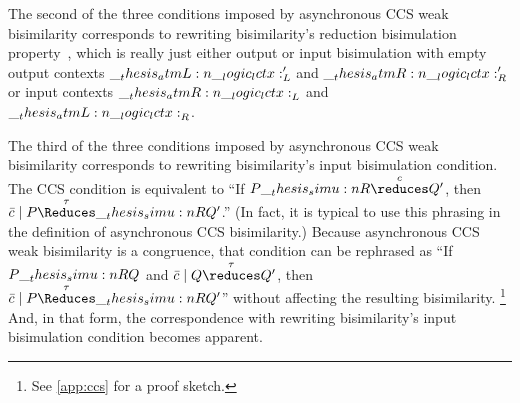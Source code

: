The second of the three conditions imposed by asynchronous \ac{CCS} weak bisimilarity corresponds to rewriting bisimilarity's reduction bisimulation property~, which is really just either output or input bisimulation with empty output contexts $\__thesis_atmL:n {\__logic_lctx:}'_L$ and $\__thesis_atmR:n {\__logic_lctx:}'_R$ or input contexts $\__thesis_atmR:n {\__logic_lctx:}_L$ and $\__thesis_atmL:n {\__logic_lctx:}_R$.

The third of the three conditions imposed by asynchronous \ac{CCS} weak bisimilarity corresponds to rewriting bisimilarity's input bisimulation condition.
The \ac{CCS} condition is equivalent to \enquote{If $P \simu{R}\overset{c}{\reduces} Q'$, then $\bar{c} \mid P \overset{\tau}{\Reduces}\simu{R} Q'$.}
(In fact, it is typical to use this phrasing in the definition of asynchronous \ac{CCS} bisimilarity.)
Because asynchronous \ac{CCS} weak bisimilarity is a congruence, that condition can be rephrased as \enquote{If $P \__thesis_simu:n {R} Q$ and $\bar{c} \mid Q \overset{\tau}{\reduces} Q'$, then $\bar{c} \mid P \overset{\tau}{\Reduces}\simu{R} Q'$} without affecting the resulting bisimilarity.%
\footnote{See \cref{app:ccs} for a proof sketch.}
And, in that form, the correspondence with rewriting bisimilarity's input bisimulation condition becomes apparent.










